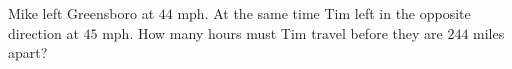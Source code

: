 Mike left Greensboro at $44$ mph. At the same time Tim left in the opposite direction at $45$ mph. How many hours must Tim travel before they are $244$ miles apart?
